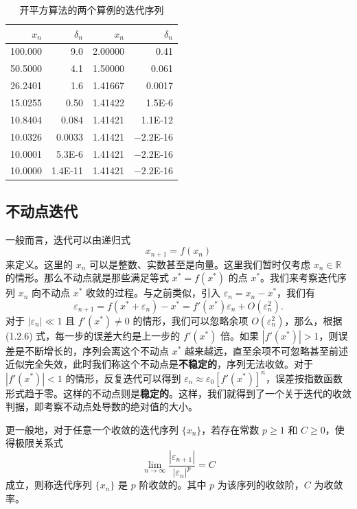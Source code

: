 \begin{table}[htbp]
\centering
\caption{开平方算法的两个算例的迭代序列}
\label{tab:sqrt-iterations}
\small
\begin{tabular}{rrrr}
\toprule
$x_n$ & $\delta_n$ & $x_n$ & $\delta_n$\\
\midrule
100.000 & 9.0 & 2.00000 & 0.41\\
50.5000 & 4.1 & 1.50000 & 0.061\\
26.2401 & 1.6 & 1.41667 & 0.0017\\
15.0255 & 0.50 & 1.41422 & 1.5E-6\\
10.8404 & 0.084 & 1.41421 & 1.1E-12\\
10.0326 & 0.0033 & 1.41421 & $-2.2$E-16\\
10.0001 & 5.3E-6 & 1.41421 & $-2.2$E-16\\
10.0000 & 1.4E-11 & 1.41421 & $-2.2$E-16\\
\bottomrule
\end{tabular}
\end{table}

\subsection{不动点迭代}

一般而言，迭代可以由递归式
\begin{equation}
 x_{n+1}=f(x_n)
\tag{1.2.5}
\end{equation}
来定义。这里的 $x_n$ 可以是整数、实数甚至是向量。这里我们暂时仅考虑 $x_n\in\mathbb R$ 的情形。那么不动点就是那些满足等式 $x^*=f(x^*)$ 的点 $x^*$。我们来考察迭代序列 $x_n$ 向不动点 $x^*$ 收敛的过程。与之前类似，引入 $\varepsilon_n=x_n-x^*$，我们有
\begin{equation}
 \varepsilon_{n+1}=f(x^*+\varepsilon_n)-x^*=f'(x^*)\varepsilon_n+O(\varepsilon_n^2).
\tag{1.2.6}
\end{equation}
对于 $|\varepsilon_n|\ll1$ 且 $f'(x^*)\ne0$ 的情形，我们可以忽略余项 $O(\varepsilon_n^2)$，那么，根据 (1.2.6) 式，每一步的误差大约是上一步的 $f'(x^*)$ 倍。如果 $|f'(x^*)|>1$，则误差是不断增长的，序列会离这个不动点 $x^*$ 越来越远，直至余项不可忽略甚至前述近似完全失效，此时我们称这个不动点是\textbf{不稳定的}，序列无法收敛。对于 $|f'(x^*)|<1$ 的情形，反复迭代可以得到 $\varepsilon_n\approx\varepsilon_0[f'(x^*)]^n$，误差按指数函数形式趋于零。这样的不动点则是\textbf{稳定的}。这样，我们就得到了一个关于迭代的收敛判据，即考察不动点处导数的绝对值的大小。

更一般地，对于任意一个收敛的迭代序列 $\{x_n\}$，若存在常数 $p\ge1$ 和 $C\ge0$，使得极限关系式
\begin{equation}
 \lim_{n\to\infty}\frac{|\varepsilon_{n+1}|}{|\varepsilon_n|^p}=C
\tag{1.2.7}
\end{equation}
成立，则称迭代序列 $\{x_n\}$ 是 $p$ 阶收敛的。其中 $p$ 为该序列的收敛阶，$C$ 为收敛率。


